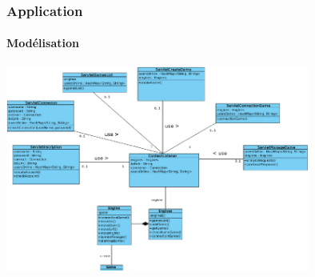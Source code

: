 \begin{frame}
\frametitle{Application}
\framesubtitle{Modélisation}

	\begin{center}
			
	\includegraphics[width=10cm]{img/serveur.png} 
		
	\end{center}
	

\end{frame}
